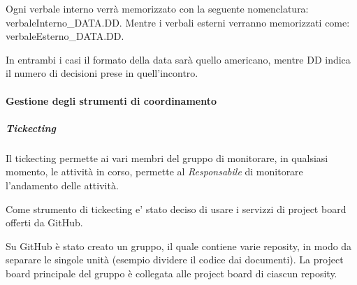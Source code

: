    					Ogni verbale interno verrà memorizzato con la seguente nomenclatura: verbaleInterno\_DATA.DD.
   					Mentre i verbali esterni verranno memorizzati come: verbaleEsterno\_DATA.DD.
   					
   					In entrambi i casi il formato della data sarà quello americano, mentre DD indica il numero di decisioni prese in quell'incontro.
   			\paragraph{Gestione degli strumenti di coordinamento}
   				\subparagraph{Tickecting}
   					Il tickecting permette ai vari membri del gruppo di monitorare, in qualsiasi momento, le attività in corso, permette al \textit{Responsabile} di monitorare l'andamento delle attività.
   					
   					Come strumento di tickecting e' stato deciso di usare i servizzi di project board offerti da GitHub.
   					
   					Su GitHub è stato creato un gruppo, il quale contiene varie reposity, in modo da separare le singole unità (esempio dividere il codice dai documenti).
   					La project board principale del gruppo è collegata  alle project board di ciascun reposity.
   					
